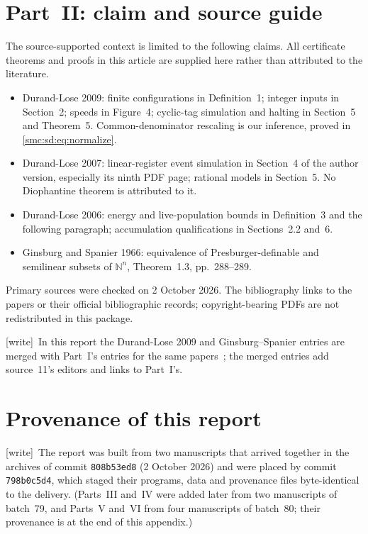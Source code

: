 \documentclass[11pt,letterpaper]{article}
\numberwithin{equation}{section}
\theoremstyle{definition}
\theoremstyle{remark}
\newcommand{\NN}{\mathbb N}
\newcommand{\wtag}{\textup{[write]}}
\begin{document}
\section{Part~II: claim and source guide}\label{smc:sd:app:sources}
The source-supported context is limited to the following claims. All certificate theorems and proofs in this article are supplied here rather than attributed to the literature.
\begin{itemize}
\item Durand-Lose 2009: finite configurations in Definition~1; integer inputs in Section~2; speeds in Figure~4; cyclic-tag simulation and halting in Section~5 and Theorem~5. Common-denominator rescaling is our inference, proved in \eqref{smc:sd:eq:normalize}.
\item Durand-Lose 2007: linear-register event simulation in Section~4 of the author version, especially its ninth PDF page; rational models in Section~5. No Diophantine theorem is attributed to it.
\item Durand-Lose 2006: energy and live-population bounds in Definition~3 and the following paragraph; accumulation qualifications in Sections~2.2 and~6.
\item Ginsburg and Spanier 1966: equivalence of Presburger-definable and semilinear subsets of $\NN^n$, Theorem~1.3, pp.~288--289.
\end{itemize}
Primary sources were checked on 2 October 2026. The bibliography links to the papers or their official bibliographic records; copyright-bearing PDFs are not redistributed in this package.


\wtag\ In this report the Durand-Lose 2009 and Ginsburg--Spanier entries are merged with Part~I's entries for the same papers~\cite{durandlose,ginsburgspanier}; the merged entries add source~11's editors and links to Part~I's.

\section{Provenance of this report}\label{smc:app:provenance}

\wtag\ The report was built from two manuscripts that arrived together in the archives of commit \texttt{808b53ed8} (2 October 2026) and were placed by commit \texttt{798b0c5d4}, which staged their programs, data and provenance files byte-identical to the delivery. (Parts~III and~IV were added later from two manuscripts of batch~79, and Parts~V and~VI from four manuscripts of batch~80; their provenance is at the end of this appendix.)
\end{document}
